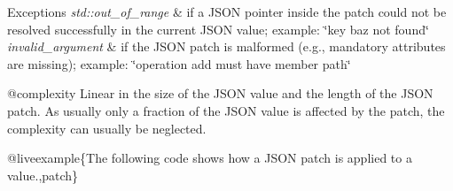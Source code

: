 \begin{DoxyExceptions}{Exceptions}
{\em std\+::out\+\_\+of\+\_\+range} & if a J\+S\+ON pointer inside the patch could not be resolved successfully in the current J\+S\+ON value; example\+: {\ttfamily \char`\"{}key baz
not found\char`\"{}} \\
\hline
{\em invalid\+\_\+argument} & if the J\+S\+ON patch is malformed (e.\+g., mandatory attributes are missing); example\+: {\ttfamily \char`\"{}operation add must have member path\char`\"{}}\\
\hline
\end{DoxyExceptions}
@complexity Linear in the size of the J\+S\+ON value and the length of the J\+S\+ON patch. As usually only a fraction of the J\+S\+ON value is affected by the patch, the complexity can usually be neglected.

@liveexample\{The following code shows how a J\+S\+ON patch is applied to a value.,patch\}

